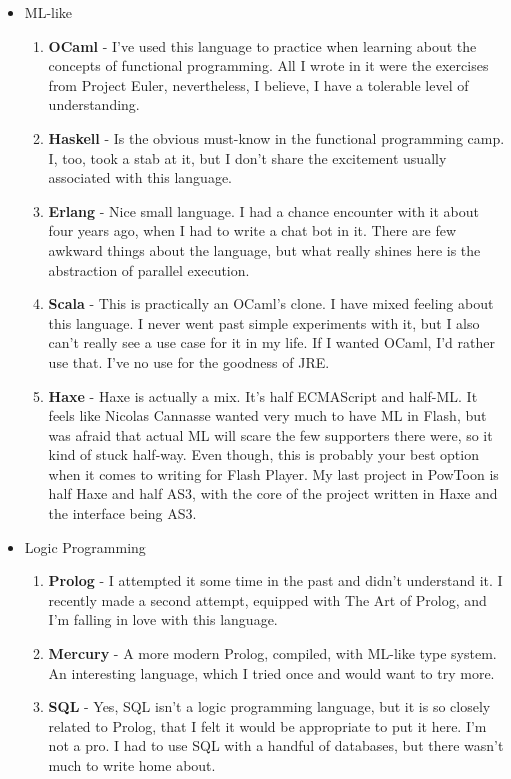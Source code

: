 \documentclass[oneside]{memoir}
\begin{document}
\begin{itemize}
\item ML-like
\begin{enumerate}
\item \textbf{OCaml} - I've used this language to practice when learning about the
concepts of functional programming.  All I wrote in it were the exercises
from Project Euler, nevertheless, I believe, I have a tolerable level of
understanding.
\item \textbf{Haskell} - Is the obvious must-know in the functional programming camp.
I, too, took a stab at it, but I don't share the excitement usually 
associated with this language.
\item \textbf{Erlang} - Nice small language.  I had a chance encounter with it about
four years ago, when I had to write a chat bot in it.  There are few
awkward things about the language, but what really shines here is the
abstraction of parallel execution.
\item \textbf{Scala} - This is practically an OCaml's clone.  I have mixed feeling about
this language.  I never went past simple experiments with it, but I also
can't really see a use case for it in my life.  If I wanted OCaml, I'd
rather use that.  I've no use for the goodness of JRE.
\item \textbf{Haxe} - Haxe is actually a mix.  It's half ECMAScript and half-ML.  It
feels like Nicolas Cannasse wanted very much to have ML in Flash, but
was afraid that actual ML will scare the few supporters there were,
so it kind of stuck half-way.  Even though, this is probably your best
option when it comes to writing for Flash Player.  My last project
in PowToon is half Haxe and half AS3, with the core of the project
written in Haxe and the interface being AS3.
\end{enumerate}

\item Logic Programming
\begin{enumerate}
\item \textbf{Prolog} - I attempted it some time in the past and didn't understand it.
I recently made a second attempt, equipped with The Art of Prolog, and
I'm falling in love with this language.
\item \textbf{Mercury} - A more modern Prolog, compiled, with ML-like type system.
An interesting language, which I tried once and would want to try more.
\item \textbf{SQL} - Yes, SQL isn't a logic programming language, but it is so 
closely related to Prolog, that I felt it would be appropriate to put it
here.  I'm not a pro.  I had to use SQL with a handful of databases, but
there wasn't much to write home about.
\end{enumerate}


\end{itemize}
\end{document}
